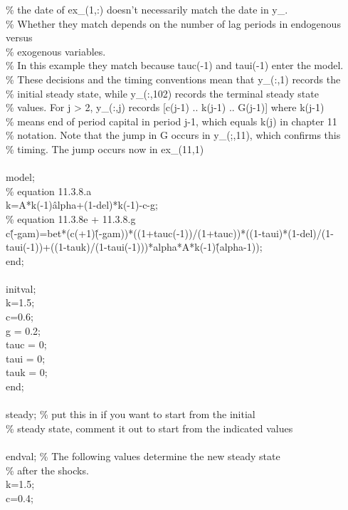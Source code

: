 \documentclass[a4paper,12pt]{scrartcl} %
\begin{document}
{\% the date of ex\_(1,:) doesn’t necessarily match the date in y\_.\\
\% Whether they match depends on the number of lag periods in endogenous versus\\
\% exogenous variables.\\
\% In this example they match because tauc(-1) and taui(-1) enter the model.\\
\% These decisions and the timing conventions mean that y\_(:,1) records the\\
\% initial steady state, while y\_(:,102) records the terminal steady state\\
\% values. For j > 2, y\_(:,j) records [c(j-1) .. k(j-1) .. G(j-1)] where k(j-1)\\
\% means end of period capital in period j-1, which equals k(j) in chapter 11\\
\% notation. Note that the jump in G occurs in y\_(;,11), which confirms this\\
\% timing. The jump occurs now in ex\_(11,1)\\
\\
model;\\
\% equation 11.3.8.a\\
k=A*k(-1)\^alpha+(1-del)*k(-1)-c-g;\\
\% equation 11.3.8e + 11.3.8.g\\
c\^(-gam)=bet*(c(+1)\^(-gam))*((1+tauc(-1))/(1+tauc))*((1-taui)*(1-del)/(1-taui(-1))+((1-tauk)/(1-taui(-1)))*alpha*A*k(-1)\^(alpha-1));\\
end;\\
\\
initval;\\
k=1.5;\\
c=0.6;\\
g = 0.2;\\
tauc = 0;\\
taui = 0;\\
tauk = 0;\\
end;\\
\\
steady; \% put this in if you want to start from the initial\\
\% steady state, comment it out to start from the indicated values\\
\\
endval; \% The following values determine the new steady state\\
\% after the shocks.\\
k=1.5;\\
c=0.4;\\
}
\end{document}
